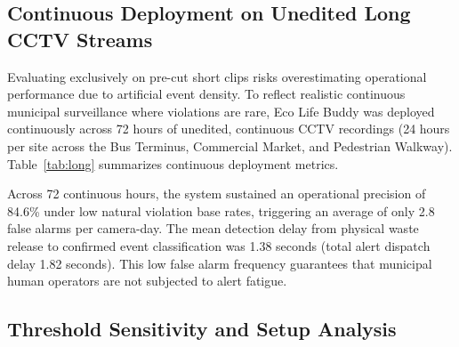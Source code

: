 \documentclass[conference]{IEEEtran}
\begin{document}
\subsection{Continuous Deployment on Unedited Long CCTV Streams}

Evaluating exclusively on pre-cut short clips risks overestimating operational performance due to artificial event density. To reflect realistic continuous municipal surveillance where violations are rare, Eco Life Buddy was deployed continuously across 72 hours of unedited, continuous CCTV recordings (24 hours per site across the Bus Terminus, Commercial Market, and Pedestrian Walkway). Table~\ref{tab:long} summarizes continuous deployment metrics.

\begin{table}[!t]
\centering
\caption{Continuous 72-Hour Deployment Evaluation (Unedited Footage)}
\label{tab:long}
\end{table}

Across 72 continuous hours, the system sustained an operational precision of 84.6\% under low natural violation base rates, triggering an average of only 2.8 false alarms per camera-day. The mean detection delay from physical waste release to confirmed event classification was 1.38 seconds (total alert dispatch delay 1.82 seconds). This low false alarm frequency guarantees that municipal human operators are not subjected to alert fatigue.

\subsection{Threshold Sensitivity and Setup Analysis}
\end{document}
